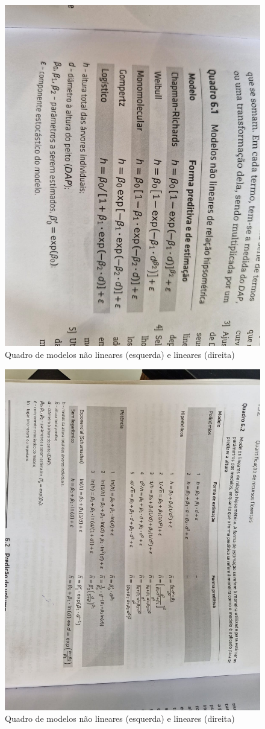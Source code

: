 \documentclass[
]{article}
\begin{document}
\begin{figure}

{\centering \includegraphics[width=0.45\linewidth]{IMAGES/modelo-nao-linear} 

}

\caption{Quadro de modelos não lineares (esquerda) e lineares (direita)}\label{fig:unnamed-chunk-23-1}
\end{figure}
\begin{figure}

{\centering \includegraphics[width=0.45\linewidth]{IMAGES/modelo-linear} 

}

\caption{Quadro de modelos não lineares (esquerda) e lineares (direita)}\label{fig:unnamed-chunk-23-2}
\end{figure}
\end{document}
